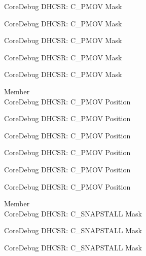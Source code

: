 \begin{DoxyRefList}
\label{deprecated__deprecated000481}%
%
Core\+Debug DHCSR\+: C\+\_\+\+PMOV Mask 

\label{deprecated__deprecated000583}%
%
Core\+Debug DHCSR\+: C\+\_\+\+PMOV Mask 

\label{deprecated__deprecated000689}%
%
Core\+Debug DHCSR\+: C\+\_\+\+PMOV Mask 

\label{deprecated__deprecated001140}%
%
Core\+Debug DHCSR\+: C\+\_\+\+PMOV Mask 

\label{deprecated__deprecated001242}%
%
Core\+Debug DHCSR\+: C\+\_\+\+PMOV Mask  
\item[Member \doxylink{group___c_m_s_i_s___s_c_b_gac414659dd5c8bd9c91ab94441ded720a}{Core\+Debug\+\_\+\+DHCSR\+\_\+\+C\+\_\+\+PMOV\+\_\+\+Pos} ]\hfill \\
\label{deprecated__deprecated000029}%
%
Core\+Debug DHCSR\+: C\+\_\+\+PMOV Position 

\label{deprecated__deprecated000480}%
%
Core\+Debug DHCSR\+: C\+\_\+\+PMOV Position 

\label{deprecated__deprecated000582}%
%
Core\+Debug DHCSR\+: C\+\_\+\+PMOV Position 

\label{deprecated__deprecated000688}%
%
Core\+Debug DHCSR\+: C\+\_\+\+PMOV Position 

\label{deprecated__deprecated001139}%
%
Core\+Debug DHCSR\+: C\+\_\+\+PMOV Position 

\label{deprecated__deprecated001241}%
%
Core\+Debug DHCSR\+: C\+\_\+\+PMOV Position  
\item[Member \doxylink{group___c_m_s_i_s___core_debug_ga53aa99b2e39a67622f3b9973e079c2b4}{Core\+Debug\+\_\+\+DHCSR\+\_\+\+C\+\_\+\+SNAPSTALL\+\_\+\+Msk} ]\hfill \\
\label{deprecated__deprecated000032}%
%
Core\+Debug DHCSR\+: C\+\_\+\+SNAPSTALL Mask 

\label{deprecated__deprecated000176}%
%
Core\+Debug DHCSR\+: C\+\_\+\+SNAPSTALL Mask 

\label{deprecated__deprecated000318}%
%
Core\+Debug DHCSR\+: C\+\_\+\+SNAPSTALL Mask 


\end{DoxyRefList}
